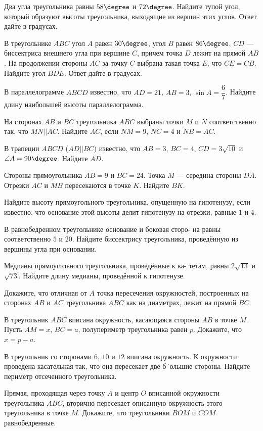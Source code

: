 \begin{class}[number=3]
	\begin{listofex}
		\item Два угла треугольника равны \( 58\degree \) и \( 72\degree \). Найдите тупой угол, который образуют высоты треугольника, выходящие из вершин этих углов. Ответ дайте в градусах.
		\item В треугольнике \( ABC \) угол \( A \) равен \( 30\degree \), угол \( B \) равен \( 86\degree \), \( CD \) --- биссектриса внешнего угла при вершине \( C \), причем точка \( D \) лежит на прямой \( AB \). На продолжении стороны \( AC \) за точку \( C \) выбрана такая точка \( E \), что \( CE = CB \). Найдите угол \( BDE \). Ответ дайте в градусах.
		\item В параллелограмме \( ABCD \) известно, что \( AD = 21 \), \( AB = 3 \), \( \sin A = \dfrac{6}{7} \). Найдите длину наибольшей высоты параллелограмма.
		\item На сторонах \( AB \) и \( BC \) треугольника \( ABC \) выбраны точки \( M \) и \( N \) соответственно так, что \( MN||AC \). Найдите \( AC \), если \( NM =9 \), \( NC =4 \) и \( NB= AC \).
		\item В трапеции \( ABCD \) (\( AD || BC \)) известно, что \( AB=3 \), \( BC =4 \), \( CD=3\sqrt{10} \) и \( \angle A=90\degree \). Найдите \( AD \).
		\item Стороны прямоугольника \( AB=9 \) и \( BC =24 \). Точка \( M \) --- середина стороны \( DA \). Отрезки \( AC \) и \( MB \) пересекаются в точке \( K \). Найдите \( BK \).
		\item Найдите высоту прямоугольного треугольника, опущенную на
		гипотенузу, если известно, что основание этой высоты делит гипотенузу на отрезки, равные \( 1 \) и \( 4 \).
		\item В равнобедренном треугольнике основание и боковая сторо-
		на равны соответственно \( 5 \) и \( 20 \). Найдите биссектрису треугольника, проведённую из вершины угла при основании.
		\item Медианы прямоугольного треугольника, проведённые к ка-
		тетам, равны \( 2\sqrt{13} \) и\( \sqrt{73} \). Найдите длину медианы, проведённой к гипотенузе.
		\item Докажите, что отличная от \( A \) точка пересечения окружностей, построенных на сторонах \( AB \) и \( AC \) треугольника \( ABC \) как на диаметрах, лежит на прямой \( BC \).
		\item В треугольник \( ABC \) вписана окружность, касающаяся стороны \( AB \) в точке \( M \). Пусть \( AM = x \), \( BC = a \), полупериметр треугольника равен \( p \). Докажите, что \( x = p - a \).
		\item В треугольник со сторонами \( 6 \), \( 10 \) и \( 12 \) вписана окружность. К окружности проведена касательная так, что
		она пересекает две б´ольшие стороны. Найдите периметр отсеченного треугольника.
		\item Прямая, проходящая через точку \( A \) и центр \( O \) вписанной окружности треугольника \( ABC \), вторично пересекает
		описанную окружность этого треугольника в точке \( M \). Докажите, что треугольники \( BOM \) и \( COM \) равнобедренные.
	\end{listofex}
\end{class}
